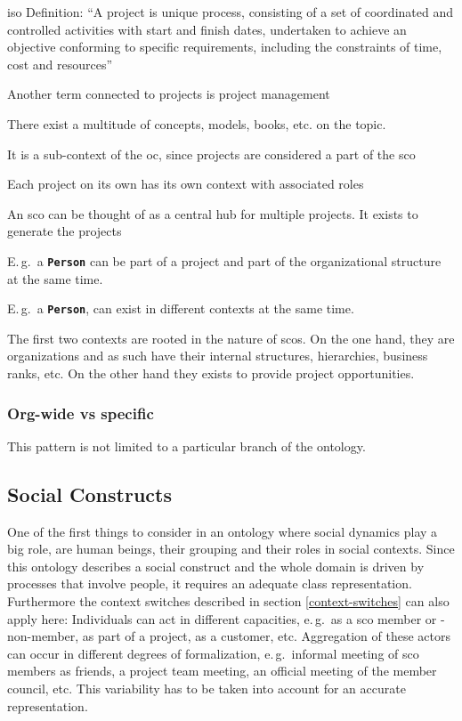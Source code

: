 \documentclass[a4paper, DIV=13, BCOR=0cm]{scrbook}
\newcommand{\eg}{e.\,g.\ }
\newcommand{\Eg}{E.\,g.\ }
\newcommand{\class}[1]{\texttt{\textbf{#1}}}
\begin{document}
\gls{iso} Definition: \enquote{A project is unique process, consisting of a set of coordinated and controlled activities with start and finish dates, undertaken to achieve an objective conforming to specific requirements, including the constraints of time, cost and resources} \cite{iso-9000-2015}



Another term connected to projects is project management

There exist a multitude of concepts, models, books, etc. on the topic.

It is a sub-context of the \gls{oc}, since projects are considered a part of the \gls{sco}

Each project on its own has its own context with associated roles

An \gls{sco} can be thought of as a central hub for multiple projects. It exists to generate the projects

\Eg a \class{Person} can be part of a project and part of the organizational structure at the same time.

\Eg a \class{Person}, can exist in different contexts at the same time.

The first two contexts are rooted in the nature of \glspl{sco}. On the one hand, they are organizations and as such have their internal structures, hierarchies, business ranks, etc. On the other hand they exists to provide project opportunities.

\subsubsection{Org-wide vs specific}

This pattern is not limited to a particular branch of the ontology.

\subsection{Social Constructs }
One of the first things to consider in an ontology where social dynamics play a big role, are human beings, their grouping and their roles in social contexts. Since this ontology describes a social construct and the whole domain is driven by processes that involve people, it requires an adequate class representation. Furthermore the context switches described in section \ref{context-switches} can also apply here: Individuals can act in different capacities, \eg as a \gls{sco} member or -non-member, as part of a project, as a customer, etc. Aggregation of these actors can occur in different degrees of formalization, \eg informal meeting of \gls{sco} members as friends, a project team meeting, an official meeting of the member council, etc. This variability has to be taken into account for an accurate representation.
\end{document}
